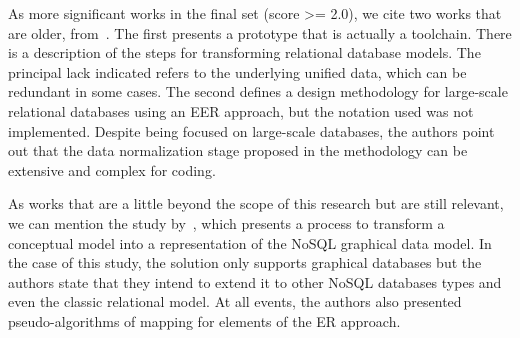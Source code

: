 As more significant works in the final set (score >= 2.0), we cite two works that are older, from~\cite{Rosenthal:1994, Teorey:1986}.
The first presents a prototype that is actually a toolchain.
There is a description of the steps for transforming relational database models.
The principal lack indicated refers to the underlying unified data, which can be redundant in some cases.
The second defines a design methodology for large-scale relational databases using an EER approach, but the notation used was not implemented.
Despite being focused on large-scale databases, the authors point out that the data normalization stage proposed in the methodology can be extensive and complex for coding.


As works that are a little beyond the scope of this research but are still relevant, we can mention the study by~\cite{deSousa:2018}, which presents a process to transform a conceptual model into a representation of the NoSQL graphical data model.
In the case of this study, the solution only supports graphical databases but the authors state that they intend to extend it to other NoSQL databases types and even the classic relational model.
At all events, the authors also presented pseudo-algorithms of mapping for elements of the ER approach.

